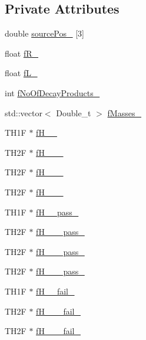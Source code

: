 \subsection*{Private Attributes}
\begin{DoxyCompactItemize}
\item 
double \hyperlink{classPsDecay_a66690e9b186fc10c3a494e9e5b2a138f}{source\+Pos\+\_\+} \mbox{[}3\mbox{]}
\item 
float \hyperlink{classPsDecay_a905b6db3efeb23b273e90f2f3984ccd7}{f\+R\+\_\+}
\item 
float \hyperlink{classPsDecay_ac1c3221c8429f1ae5d9ae2a1c520693e}{f\+L\+\_\+}
\item 
int \hyperlink{classPsDecay_a58f1f81e395d364ede01d5a8bc894d75}{f\+No\+Of\+Decay\+Products\+\_\+}
\item 
std\+::vector$<$ Double\+\_\+t $>$ \hyperlink{classPsDecay_a4669d133357c99ee6dd74d7e60c569e2}{f\+Masses\+\_\+}
\item 
T\+H1F $\ast$ \hyperlink{classPsDecay_a6ffb64480ec7bb3eb9243b20e8130e42}{f\+H\+\_\+\_\+}
\item 
T\+H2F $\ast$ \hyperlink{classPsDecay_a4ae2285b3310298d6c16722c31c7a577}{f\+H\+\_\+\_\+\_\+}
\item 
T\+H2F $\ast$ \hyperlink{classPsDecay_a7748ba2d2bc38d63f994384daa510f44}{f\+H\+\_\+\_\+\_\+}
\item 
T\+H2F $\ast$ \hyperlink{classPsDecay_a377a85bffa5b853437f82c027954be49}{f\+H\+\_\+\_\+\_\+}
\item 
T\+H1F $\ast$ \hyperlink{classPsDecay_a4f9fdbf77ce499b590a18bb36971632d}{f\+H\+\_\+\_\+pass\+\_\+}
\item 
T\+H2F $\ast$ \hyperlink{classPsDecay_a6dd5ce52db37f0dfe214eb5cee6af997}{f\+H\+\_\+\_\+\_\+pass\+\_\+}
\item 
T\+H2F $\ast$ \hyperlink{classPsDecay_a67645ae244636b74b4f9f7ce1dc743bb}{f\+H\+\_\+\_\+\_\+pass\+\_\+}
\item 
T\+H2F $\ast$ \hyperlink{classPsDecay_a3fe38b267cb5662574862237d79e0f36}{f\+H\+\_\+\_\+\_\+pass\+\_\+}
\item 
T\+H1F $\ast$ \hyperlink{classPsDecay_a8fedb5a14c4e8a7c0b09b084fcd4eec1}{f\+H\+\_\+\_\+fail\+\_\+}
\item 
T\+H2F $\ast$ \hyperlink{classPsDecay_a403e21c0bd6fe979a43bc6b8f267041c}{f\+H\+\_\+\_\+\_\+fail\+\_\+}
\item 
T\+H2F $\ast$ \hyperlink{classPsDecay_afbac4f1be93aa53f00f7c80b88d0e291}{f\+H\+\_\+\_\+\_\+fail\+\_\+}

\end{DoxyCompactItemize}
